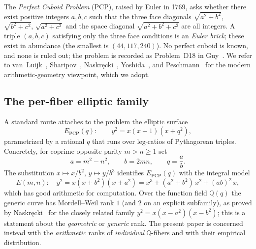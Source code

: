 \documentclass[11pt,reqno]{amsart}
\theoremstyle{plain}
\theoremstyle{definition}
\theoremstyle{remark}
\newcommand{\Q}{\mathbb{Q}}
\newcommand{\PCP}{E_{\mathrm{PCP}}}
\begin{document}
The \emph{Perfect Cuboid Problem} (PCP), raised by Euler in 1769, asks whether
there exist positive integers $a,b,c$ such that the three face diagonals
$\sqrt{a^2+b^2}$, $\sqrt{b^2+c^2}$, $\sqrt{a^2+c^2}$ and the space diagonal
$\sqrt{a^2+b^2+c^2}$ are all integers. A triple $(a,b,c)$ satisfying only the
three face conditions is an \emph{Euler brick}; these exist in abundance (the
smallest is $(44,117,240)$). No perfect cuboid is known, and none is ruled out;
the problem is recorded as Problem~D18 in Guy~\cite{Guy}. We refer to
van~Luijk~\cite{vanLuijk}, Sharipov~\cite{Sharipov}, Naskr\k{e}cki~\cite{Nas},
Yoshida~\cite{Yoshida}, and Peschmann~\cite{Pesch1,Pesch2} for the modern
arithmetic-geometry viewpoint, which we adopt.

\subsection*{The per-fiber elliptic family}
A standard route attaches to the problem the elliptic surface
\[
  \PCP(q)\colon\qquad y^2 = x(x+1)(x+q^2),
\]
parametrized by a rational $q$ that runs over leg-ratios of Pythagorean
triples. Concretely, for coprime opposite-parity $m>n\ge 1$ set
\begin{equation}\label{eq:param}
  a = m^2-n^2,\qquad b = 2mn,\qquad q = \frac{a}{b}.
\end{equation}
The substitution $x\mapsto x/b^2$, $y\mapsto y/b^3$ identifies $\PCP(q)$ with
the integral model
\begin{equation}\label{eq:Emn}
  E(m,n)\colon\quad y^2 = x(x+b^2)(x+a^2) = x^3 + (a^2+b^2)\,x^2 + (ab)^2\,x,
\end{equation}
which has good arithmetic for computation. Over the function field $\Q(q)$ the
generic curve has Mordell--Weil rank $1$ (and $2$ on an explicit subfamily), as
proved by Naskr\k{e}cki~\cite{Nas} for the closely related family
$y^2=x(x-a^2)(x-b^2)$; this is a statement about the \emph{geometric} or
\emph{generic} rank. The present paper is concerned instead with the
\emph{arithmetic} ranks of \emph{individual} $\Q$-fibers and with their
empirical distribution.
\end{document}
